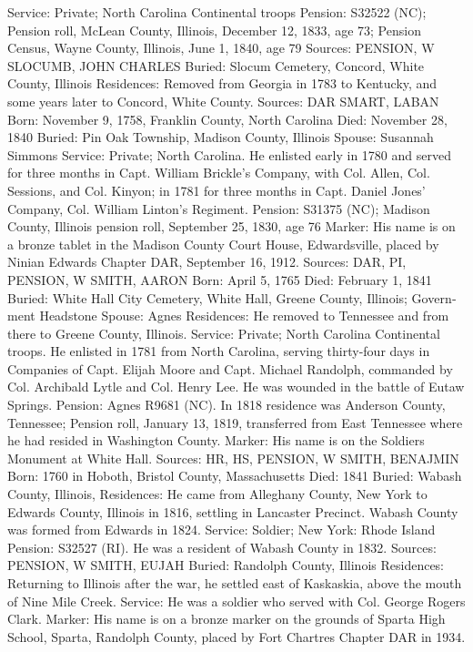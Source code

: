 Service: Private; North Carolina Continental troops
Pension: S32522 (NC); Pension roll, McLean County, Illinois, December 12, 1833, age 73; Pension Census, Wayne County, Illinois, June 1, 1840, age 79
Sources: PENSION, W 
SLOCUMB, JOHN CHARLES
Buried: Slocum Cemetery, Concord, White County, Illinois Residences: Removed from Georgia in 1783 to Kentucky, and some years later to Concord, White County.
Sources: DAR 
SMART, LABAN 
Born: November 9, 1758, Franklin County, North Carolina
Died:  November 28, 1840
Buried: Pin Oak Township, Madison County, Illinois
Spouse: Susannah Simmons
Service: Private; North Carolina. He enlisted early in 1780 and served for three months in Capt. William Brickle's Company, with Col. Allen, Col. Sessions, and Col. Kinyon; in 1781 for three months in Capt. Daniel Jones' Company, Col. William Linton's Regiment. 
Pension: S31375 (NC); Madison County, Illinois pension roll, September 25, 1830, age 76
Marker: His name is on a bronze tablet in the Madison County Court House, Edwardsville, placed by Ninian Edwards Chapter DAR, September 16, 1912.
Sources: DAR, PI, PENSION, W 
SMITH, AARON 
Born: April 5, 1765
Died: February 1, 1841
Buried: White Hall City Cemetery, White Hall, Greene County, Illinois; Govern­ment Headstone
Spouse: Agnes 
Residences: He removed to Tennessee and from there to Greene County, Illinois.
Service: Private; North Carolina Continental troops. He enlisted in 1781 from North Carolina, serving thirty-four days in Companies of Capt. Elijah Moore and Capt. Michael Randolph, commanded by Col. Archibald Lytle and Col. Henry Lee. He was wounded in the battle of Eutaw Springs. 
Pension: Agnes R9681 (NC). In 1818 residence was Anderson County, Tennessee; Pension roll, January 13, 1819, transferred from East Tennessee where he had resided in Washington County. 
Marker: His name is on the Soldiers Monument at White Hall. 
Sources: HR, HS, PENSION, W 
SMITH, BENAJMIN 
Born: 1760 in Hoboth, Bristol County, Massachusetts
Died: 1841
Buried: Wabash County, Illinois, Residences: He came from Alleghany County, New York to Edwards County, Illinois in 1816, settling in Lancaster Precinct. Wabash County was formed from Edwards in 1824.
Service: Soldier; New York: Rhode Island
Pension: S32527 (RI). He was a resident of Wabash County in 1832.
Sources: PENSION, W 
SMITH, EUJAH 
Buried: Randolph County, Illinois 
Residences: Returning to Illinois after the war, he settled east of Kaskaskia, above the mouth of Nine Mile Creek.
Service: He was a soldier who served with Col. George Rogers Clark.
Marker: His name is on a bronze marker on the grounds of Sparta High School, Sparta, Randolph County, placed by Fort Chartres Chapter DAR in 1934.
